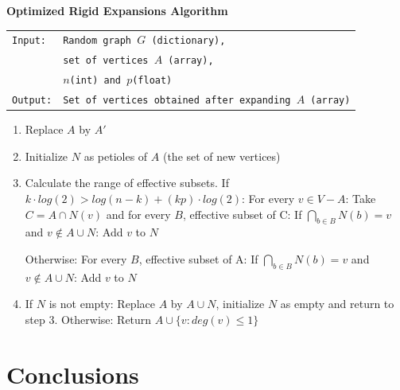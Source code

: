 \begin{cajita}
\textbf{Optimized Rigid Expansions Algorithm} \hfill \break

\begin{tabular}{ l l }
\texttt{Input:} &  \texttt{Random graph $G$ (dictionary),} \\
                &  \texttt{set of vertices $A$ (array),} \\
                &  \texttt{$n$(int) and $p$(float)} \\
\texttt{Output:} & \texttt{Set of vertices obtained after expanding $A$ (array)} \\
\end{tabular}
\begin{enumerate}
\item Replace $A$ by $A'$
\item Initialize $N$ as petioles of $A$ (the set of new vertices)
\item Calculate the range of effective subsets.\hfill \break
If $k\cdot log(2) > log(n-k) + (kp)\cdot log(2)$: \hfill \break
\hphantom{12} For every $v\in V-A$:\hfill \break
\hphantom{1234} Take $C = A\cap N(v)$ and for every $B$, effective subset of C:\hfill \break
\hphantom{123456} If $\bigcap\limits_{b\in B} N(b) = v$ and $v\not\in A\cup N$: \hfill \break
\hphantom{12341234} Add $v$ to $N$

Otherwise:\hfill \break
\hphantom{12} For every $B$, effective subset of A:\hfill \break
\hphantom{1234} If $\bigcap\limits_{b\in B} N(b) = v$ and $v\not\in A\cup N$: \hfill \break
\hphantom{123456} Add $v$ to $N$

\item If $N$ is not empty: \hfill \break
\hphantom{12} Replace $A$ by $A\cup N$, initialize $N$ as empty and return to step 3. \hfill \break
      Otherwise:\hfill \break
\hphantom{12} Return $A\cup\{v: deg(v)\leq 1 \}$
\end{enumerate}
\end{cajita}

\section{Conclusions}







